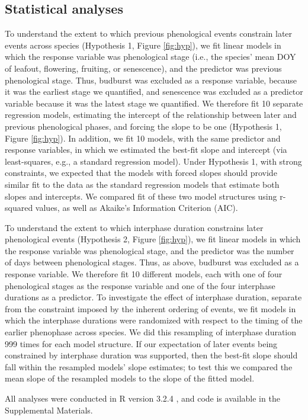 \documentclass{article}
\begin{document}
\subsection*{Statistical analyses}
To understand the extent to which previous phenological events constrain later events across species (Hypothesis 1, Figure \ref{fig:hyp}), we fit linear models in which the response variable was phenological stage (i.e., the species' mean DOY of leafout, flowering, fruiting, or senescence), and the predictor was previous phenological stage. Thus, budburst was excluded as a response variable, because it was the earliest stage we quantified, and senescence was excluded as a predictor variable because it was the latest stage we quantified. We therefore fit 10 separate regression models, estimating the intercept of the relationship between later and previous phenological phases, and forcing the slope to be one (Hypothesis 1, Figure \ref{fig:hyp}). In addition, we fit 10 models, with the same predictor and response variables, in which we estimated the best-fit slope and intercept (via least-squares, e.g., a standard regression model). Under Hypothesis 1, with strong constraints, we expected that the models with forced slopes should provide similar fit to the data as the standard regression models that estimate both slopes and intercepts. We compared fit of these two model structures using r-squared values, as well as Akaike's Information Criterion (AIC). 
\par To understand the extent to which interphase duration constrains later phenological events (Hypothesis 2, Figure \ref{fig:hyp}), we fit linear models in which the response variable was phenological stage, and the predictor was the number of days between phenological stages. Thus, as above, budburst was excluded as a response variable. We therefore fit 10 different models, each with one of four phenological stages as the response variable and one of the four interphase durations as a predictor. To investigate the effect of interphase duration, separate from the constraint imposed by the inherent ordering of events, we fit models in which the interphase durations were randomized with respect to the timing of the earlier phenophase across species. We did this resampling of interphase duration 999 times for each model structure. If our expectation of later events being constrained by interphase duration was supported, then the best-fit slope should fall within the resampled models' slope estimates; to test this we compared the mean slope of the resampled models to the slope of the fitted model. %
\par All analyses were conducted in R version 3.2.4 \citep{rcoreteam2016}, and code is available in the Supplemental Materials.
\end{document}
